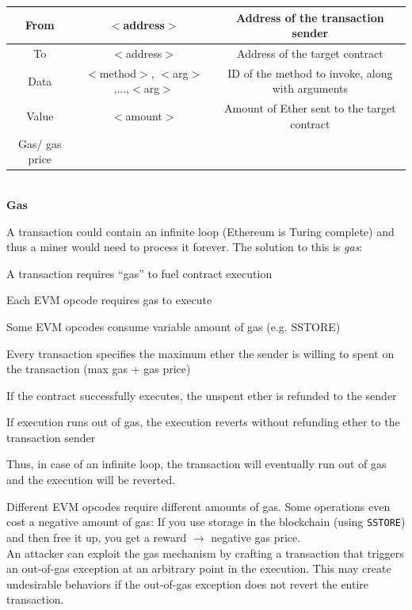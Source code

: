 \documentclass[11pt,oneside,a4paper]{article}
\begin{document}
\begin{tabular}{|c|c|c|}
	\hline 
	From & $<$address$>$ & Address of the transaction sender \\ 
	\hline 
	To & $<$address$>$ & Address of the target contract \\ 
	\hline 
	Data & $<$method$>$, $<$arg$>$,...,$<$arg$>$ & ID of the method to invoke, along with arguments \\ 
	\hline 
	Value & $<$amount$>$ & Amount of Ether sent to the target contract \\ 
	\hline 
	Gas/ gas price &  &  \\ 
	\hline 
\end{tabular}\\

\textbf{Gas}

A transaction could contain an infinite loop (Ethereum is Turing complete) and thus a miner would need to process it forever. The solution to this is \textit{gas}:

\begin{compactitem}
	\item A transaction requires “gas” to fuel contract execution
	\item Each EVM opcode requires gas to execute
	\item Some EVM opcodes consume variable amount of gas (e.g. SSTORE)
	\item Every transaction specifies the maximum ether the sender is willing to spent on the transaction (max gas + gas price)
	\item If the contract successfully executes, the unspent ether is refunded to the sender
	\item If execution runs out of gas, the execution reverts without refunding ether to the transaction sender
\end{compactitem}

Thus, in case of an infinite loop, the transaction will eventually run out of gas and the execution will be reverted.

Different EVM opcodes require different amounts of gas. Some operations even cost a negative amount of gas: If you use storage in the blockchain (using \texttt{SSTORE}) and then free it up, you get a reward $\rightarrow$ negative gas price.\\

An attacker can exploit the gas mechanism by crafting a transaction that triggers an out-of-gas exception at an arbitrary point in the execution. This may create undesirable behaviors if the out-of-gas exception
does not revert the entire transaction.\\
\end{document}

